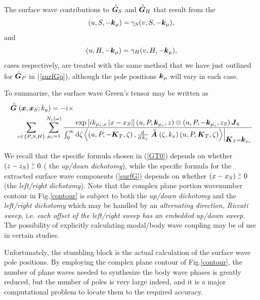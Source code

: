 The surface wave contributions to  $\stackrel{\scriptscriptstyle _{\,\,\circ}}{ \mbox{\boldmath$\mit G$\unboldmath}}_{S}$ and  $\stackrel{\scriptscriptstyle _{\,\,\circ}}{ \mbox{\boldmath$\mit G$\unboldmath}}_{H}$
 that result from the 
\[
(u,S,-{\mbox{\boldmath$\mit k$\unboldmath}}_{\mu})=\gamma_{S} (v,S,-{\mbox{\boldmath$\mit k$\unboldmath}}_{\mu}),
\]
and
\[
(u,H,-{\mbox{\boldmath$\mit k$\unboldmath}}_{\mu})=\gamma_{H} (v,H,-{\mbox{\boldmath$\mit k$\unboldmath}}_{\mu}),
\]
cases respectively,  are treated  with the same method that we have just outlined for 
$\stackrel{\scriptscriptstyle _{\,\,\circ}}{ \mbox{\boldmath$\mit G$\unboldmath}}_{P}$ in (\ref{surfGp}), although the pole positions ${\mbox{\boldmath$\mit k$\unboldmath}}_{\mu}$ will vary in each case.

To summarize, the surface wave Green's tensor may be written as 
\begin{eqnarray}	\label{surfG}
\lefteqn{
\rf{\bmi  G}({\bmi  x},{\bmi  x}_{S};k_y)=-i \times
}\\
&& \sum\limits_{c \in \{ P,S,H \}}
\sum\limits_{\mu_c = 1}^{  N_{c}( \omega)}  
{\frac{\exp\left[{i{ k}_{ \mu_c,x }\left|{x-{x}_{S}}\right|}\right]
	\left({  u,P,{\bmi k}_{ \mu_c },z}\right)\otimes \left({  
	u,P,-{\bmi k}_{ \mu_c },z_S}\right){ \bmi  J}_{6}}{\int_{  
	0}^{\infty }  {\rm d} \zeta {\left.{\left\langle{\left({  
	u,P,-{\bmi K}_{T},\zeta}\right)  ,{\frac{{\rm d}\,}{{\rm 
d}\,{ k}_{x}}}\rf{\bmi  A}(\zeta,k_x)
	\left({u,P,{\bmi K}_{T},\zeta}\right)}\right\rangle}\right|}_{{ 
	 \bmi K}_{T}  ={\bmi k}_{ \mu_c }}}}\nonumber 
\end{eqnarray}

We recall that the specific formula chosen in (\ref{GT0}) depends on 
whether $(z-z_S) \stackrel{\scriptscriptstyle >}{\scriptscriptstyle _<} 0$ ( the {\em up/down dichotomy\/}), 
while the specific formula for the extracted 
surface wave components (\ref{surfG}) depends on
whether $(x-x_S) \stackrel{\scriptscriptstyle >}{\scriptscriptstyle _<} 0$ (the {\em left/right dichotomy\/}). 
Note that the complex plane portion wavenumber contour  in 
Fig.\ref{contour}
is subject to both the  {\em up/down dichotomy\/} and the {\em left/right 
dichotomy\/} which may be handled by an {\em alternating direction, Riccati 
sweep\/}, i.e. {\em each offset of the left/right sweep has an embedded 
up/down sweep\/}. The possibility of explicitly calculating modal/body wave 
coupling may be of use in certain studies.

Unfortunately, the stumbling block is the actual calculation of the 
surface wave pole positions. By employing the complex plane contour
of Fig.\ref{contour}, the number of plane waves needed to synthesize the 
body wave phases is greatly reduced, but the number of poles is very 
large indeed, and it is a major computational problem to locate them to 
the required accuracy.






